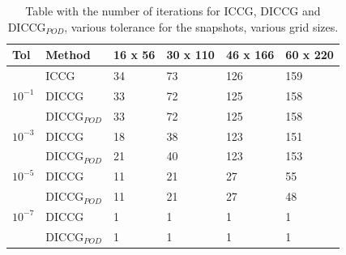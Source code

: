 \documentclass{ecmorXV}
\begin{document}
\begin{table}[!ht]
\centering
\begin{tabular}{|p{1.5cm} |p{2cm}|p{1.5cm}|p{1.5cm}|p{1.5cm}|p{1.5cm}|  } 
 \hline
  Tol&Method  & 16 x 56 & 30 x 110 & 46 x 166 & 60 x 220\\
  \hline
  &ICCG                & 34 & 73&  126&  159\\ 
  \hline
$10 ^{-1}$ & DICCG & 33 & 72&  125 &  158 \\ 
 & DICCG$_{POD}$ & 33 & 72&  125 &  158 \\ 
  \hline
 $10 ^{-3}$ &DICCG& 18 & 38&  123&  151 \\ 
  & DICCG$_{POD}$ & 21 & 40&  123 &  153 \\ 
  \hline

$10 ^{-5}$ &  DICCG& 11 & 21&  27 &  55\\ 
 & DICCG$_{POD}$ & 11 & 21&  27 &  48 \\ 
   \hline

 $10 ^{-7}$  &DICCG & 1 & 1&  1 &  1 \\ 
  & DICCG$_{POD}$ & 1 & 1&  1 &  1 \\ 
\hline
\end{tabular}
\caption{Table with the number of iterations for ICCG, DICCG and DICCG$_{POD}$, various tolerance for the snapshots,
various grid sizes.}
\label{table:itgrid}
\end{table}
\end{document}
